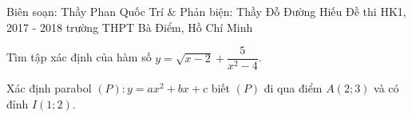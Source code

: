 
\begin{name}
{Biên soạn: Thầy Phan Quốc Trí \& Phản biện: Thầy Đỗ Đường Hiếu}
{Đề thi HK1, 2017 - 2018 trường THPT Bà Điểm, Hồ Chí Minh}
\end{name}

\setcounter{bt}{0}
\begin{bt}%
Tìm tập xác định của hàm số $y=\sqrt{x-2}+\dfrac{5}{x^2-4}$.
\end{bt}

\begin{bt}%
Xác định parabol $(P):y=ax^2+bx+c $ biết $(P)$ đi qua điểm $A(2;3)$ và có đỉnh $I(1;2)$.
\end{bt}

